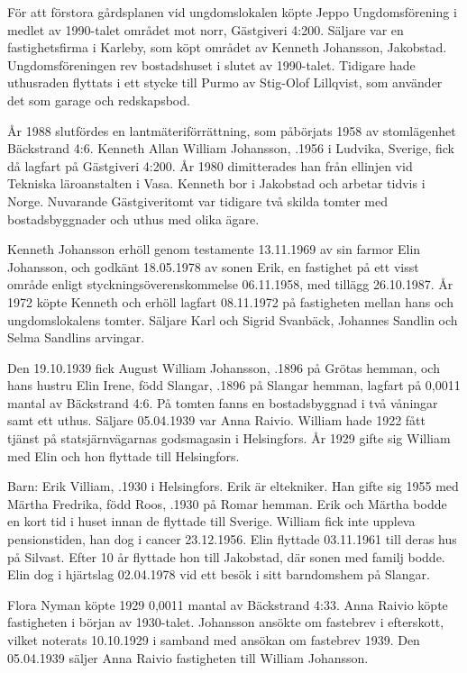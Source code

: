 För att förstora gårdsplanen vid ungdomslokalen köpte Jeppo	Ungdomsförening i medlet av 1990-talet området mot norr,	Gästgiveri 4:200. Säljare var en fastighetsfirma i Karleby, som köpt området av Kenneth Johansson, Jakobstad. Ungdomsföreningen	rev bostadshuset i slutet av 1990-talet. Tidigare hade uthusraden	flyttats i ett stycke till Purmo av Stig-Olof Lillqvist, som använder det som garage och redskapsbod.


År 1988 slutfördes en lantmäteriförrättning, som påbörjats 1958	av stomlägenhet Bäckstrand 4:6. Kenneth Allan William Johansson,	.1956 i Ludvika, Sverige, fick då lagfart på Gästgiveri 4:200.	År 1980 dimitterades han från ellinjen vid Tekniska läroanstalten i Vasa.	Kenneth bor i Jakobstad och arbetar tidvis i Norge. Nuvarande Gästgiveritomt var tidigare två skilda tomter med	bostadsbyggnader och uthus med olika ägare.

Kenneth Johansson erhöll genom testamente 13.11.1969 av sin farmor Elin Johansson, och godkänt 18.05.1978 av sonen Erik, en fastighet på ett visst område enligt styckningsöverenskommelse 06.11.1958, med tillägg 26.10.1987. År 1972 köpte Kenneth och erhöll lagfart 08.11.1972 på fastigheten mellan hans och ungdomslokalens tomter. Säljare Karl och Sigrid Svanbäck, Johannes Sandlin och Selma Sandlins arvingar.


Den 19.10.1939 fick August William Johansson, .1896 på	Grötas hemman, och hans hustru Elin Irene, född Slangar, .1896	på Slangar hemman, lagfart på 0,0011 mantal av Bäckstrand 4:6. På tomten fanns en bostadsbyggnad i två våningar samt ett uthus. Säljare 05.04.1939 var Anna Raivio. William hade 1922 fått tjänst på 	statsjärnvägarnas godsmagasin i Helsingfors. År 1929 gifte sig William med Elin och hon flyttade till Helsingfors.

Barn: Erik Villiam, .1930 i Helsingfors. Erik är eltekniker. Han gifte sig 1955 med 	Märtha Fredrika, född Roos, .1930 på Romar hemman. Erik och Märtha bodde en kort tid i huset innan de flyttade till Sverige. William fick inte uppleva pensionstiden, han dog i cancer 23.12.1956. Elin flyttade 03.11.1961 till deras hus på Silvast. Efter 10 år flyttade hon till Jakobstad, där sonen med familj bodde. Elin dog i hjärtslag 02.04.1978 vid ett besök i sitt barndomshem på Slangar.


Flora Nyman köpte 1929 0,0011 mantal av Bäckstrand 4:33. Anna Raivio  köpte fastigheten i början av 1930-talet. Johansson ansökte om fastebrev i efterskott, vilket noterats 10.10.1929 i samband med ansökan	om fastebrev 1939. Den 05.04.1939 säljer Anna Raivio fastigheten till William Johansson.



